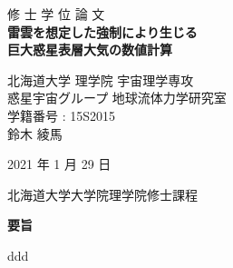 \documentclass[a4j,12pt,openbib,oneside]{jreport}
\begin{document}
\begin{titlepage}
 \centering
 \vspace*{40truept}
 {\Huge 修 \hspace{10pt} 士 \hspace{10pt} 学 \hspace{10pt} 位
 \hspace{10pt} 論 \hspace{10pt} 文}\\  %
 \vspace*{50truept}
 \textbf{{\Huge 雷雲を想定した強制により生じる\\
巨大惑星表層大気の数値計算}} \\ %
 \vspace{30truept}
 \vspace{150truept}
 \begin{center}
  {\Large 北海道大学 理学院 宇宙理学専攻}
  \vspace{10truept}\\
  {\Large 惑星宇宙グループ 地球流体力学研究室}
  \vspace{10truept}\\
  {\Large 学籍番号 : 15S2015} 
  \vspace{30truept}\\
  {\LARGE 鈴木 綾馬}
  \vspace{10truept}
 \end{center}
 \begin{center}
  {\Large 2021 年 1 月 29 日}
 \end{center}
 \vspace{50truept}
 {\Large 北海道大学大学院理学院修士課程} \\
\end{titlepage}


\thispagestyle{empty}
\setcounter{page}{0}

\clearpage
\begin{center}
\large{\bf 要旨}
\end{center}
\thispagestyle{empty}
\setcounter{page}{0}
ddd

\clearpage
\thispagestyle{empty}
\setcounter{page}{0}
\tableofcontents 
\thispagestyle{empty}
\setcounter{page}{0}

\clearpage
\setcounter{table}{0}
\setcounter{figure}{0}
\end{document}
